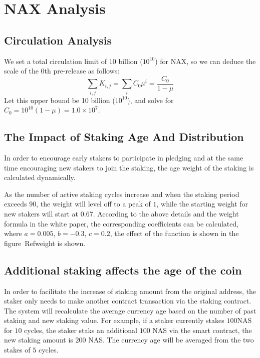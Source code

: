 \section{NAX Analysis}
\subsection{Circulation Analysis}
We set a total circulation limit of 10 billion (\(10^{10}\)) for NAX, so we can deduce the scale of the 0th pre-release as follows:
\begin{equation}
  \sum_{i,j} K_{i,j} = \sum_i C_0 \mu^i = \frac{C_0}{1-\mu}
\end{equation}
  Let this upper bound be 10 billion (\(10^{10}\)), and solve for \(C_0 = 10^{10}(1-\mu) = 1.0\times10^7\).

\subsection{The Impact of Staking Age And Distribution}
In order to encourage early stakers to participate in pledging and at the same time encouraging new stakers to join the staking, the age weight of the staking is calculated dynamically. 

As the number of active staking cycles increase and when the staking period exceeds $90$, the weight will level off to a peak of $1$, while the starting weight for new stakers will start at $0.67$. According to the above details and the weight formula in the white paper, the corresponding coefficients can be calculated, where \(a=0.005\), \(b=-0.3\), \(c=0.2\), the effect of the function is shown in the figure\ Ref{weight} is shown.

\subsection{Additional staking affects the age of the coin}
In order to facilitate the increase of staking amount from the original address, the staker only needs to make another contract transaction via the staking contract. The system will recalculate the average currency age based on the number of past staking and new staking value. For example, if a staker currently stakes $100$NAS for $10$ cycles, the staker staks an additional $100$ NAS via the smart contract, the new staking amount is $200$ NAS. The currency age will be averaged from the two stakes of $5$ cycles.
